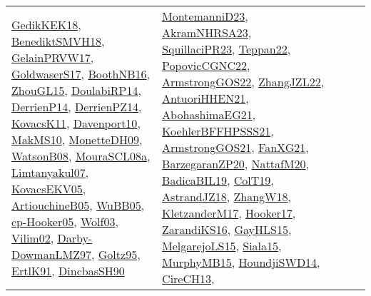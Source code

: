 {\begin{longtable}{lp{3cm}>{\raggedright}p{6cm}>{\raggedright}p{6cm}p{8cm}}
\href{articles/GedikKEK18.pdf}{GedikKEK18}\cite{GedikKEK18}, \href{papers/BenediktSMVH18.pdf}{BenediktSMVH18}\cite{BenediktSMVH18}, \href{papers/GelainPRVW17.pdf}{GelainPRVW17}\cite{GelainPRVW17}, \href{papers/GoldwaserS17.pdf}{GoldwaserS17}\cite{GoldwaserS17}, \href{papers/BoothNB16.pdf}{BoothNB16}\cite{BoothNB16}, \href{papers/ZhouGL15.pdf}{ZhouGL15}\cite{ZhouGL15}, \href{papers/DoulabiRP14.pdf}{DoulabiRP14}\cite{DoulabiRP14}, \href{papers/DerrienP14.pdf}{DerrienP14}\cite{DerrienP14}, \href{papers/DerrienPZ14.pdf}{DerrienPZ14}\cite{DerrienPZ14}, \href{articles/KovacsK11.pdf}{KovacsK11}\cite{KovacsK11}, \href{papers/Davenport10.pdf}{Davenport10}\cite{Davenport10}, \href{papers/MakMS10.pdf}{MakMS10}\cite{MakMS10}, \href{papers/MonetteDH09.pdf}{MonetteDH09}\cite{MonetteDH09}, \href{papers/WatsonB08.pdf}{WatsonB08}\cite{WatsonB08}, \href{papers/MouraSCL08a.pdf}{MouraSCL08a}\cite{MouraSCL08a}, \href{papers/Limtanyakul07.pdf}{Limtanyakul07}\cite{Limtanyakul07}, \href{papers/KovacsEKV05.pdf}{KovacsEKV05}\cite{KovacsEKV05}, \href{papers/ArtiouchineB05.pdf}{ArtiouchineB05}\cite{ArtiouchineB05}, \href{papers/WuBB05.pdf}{WuBB05}\cite{WuBB05}, \href{papers/cp-Hooker05.pdf}{cp-Hooker05}\cite{cp-Hooker05}, \href{papers/Wolf03.pdf}{Wolf03}\cite{Wolf03}, \href{papers/Vilim02.pdf}{Vilim02}\cite{Vilim02}, \href{articles/Darby-DowmanLMZ97.pdf}{Darby-DowmanLMZ97}\cite{Darby-DowmanLMZ97}, \href{papers/Goltz95.pdf}{Goltz95}\cite{Goltz95}, \href{papers/ErtlK91.pdf}{ErtlK91}\cite{ErtlK91}, \href{articles/DincbasSH90.pdf}{DincbasSH90}\cite{DincbasSH90} & \href{articles/MontemanniD23.pdf}{MontemanniD23}\cite{MontemanniD23}, \href{articles/AkramNHRSA23.pdf}{AkramNHRSA23}\cite{AkramNHRSA23}, \href{papers/SquillaciPR23.pdf}{SquillaciPR23}\cite{SquillaciPR23}, \href{papers/Teppan22.pdf}{Teppan22}\cite{Teppan22}, \href{papers/PopovicCGNC22.pdf}{PopovicCGNC22}\cite{PopovicCGNC22}, \href{papers/ArmstrongGOS22.pdf}{ArmstrongGOS22}\cite{ArmstrongGOS22}, \href{papers/ZhangJZL22.pdf}{ZhangJZL22}\cite{ZhangJZL22}, \href{papers/AntuoriHHEN21.pdf}{AntuoriHHEN21}\cite{AntuoriHHEN21}, \href{articles/AbohashimaEG21.pdf}{AbohashimaEG21}\cite{AbohashimaEG21}, \href{articles/KoehlerBFFHPSSS21.pdf}{KoehlerBFFHPSSS21}\cite{KoehlerBFFHPSSS21}, \href{papers/ArmstrongGOS21.pdf}{ArmstrongGOS21}\cite{ArmstrongGOS21}, \href{articles/FanXG21.pdf}{FanXG21}\cite{FanXG21}, \href{papers/BarzegaranZP20.pdf}{BarzegaranZP20}\cite{BarzegaranZP20}, \href{papers/NattafM20.pdf}{NattafM20}\cite{NattafM20}, \href{papers/BadicaBIL19.pdf}{BadicaBIL19}\cite{BadicaBIL19}, \href{papers/ColT19.pdf}{ColT19}\cite{ColT19}, \href{papers/AstrandJZ18.pdf}{AstrandJZ18}\cite{AstrandJZ18}, \href{articles/ZhangW18.pdf}{ZhangW18}\cite{ZhangW18}, \href{papers/KletzanderM17.pdf}{KletzanderM17}\cite{KletzanderM17}, \href{papers/Hooker17.pdf}{Hooker17}\cite{Hooker17}, \href{articles/ZarandiKS16.pdf}{ZarandiKS16}\cite{ZarandiKS16}, \href{papers/GayHLS15.pdf}{GayHLS15}\cite{GayHLS15}, \href{papers/MelgarejoLS15.pdf}{MelgarejoLS15}\cite{MelgarejoLS15}, \href{articles/Siala15.pdf}{Siala15}\cite{Siala15}, \href{papers/MurphyMB15.pdf}{MurphyMB15}\cite{MurphyMB15}, \href{papers/HoundjiSWD14.pdf}{HoundjiSWD14}\cite{HoundjiSWD14}, \href{papers/CireCH13.pdf}{CireCH13}\cite{CireCH13}, 
\end{longtable}}
